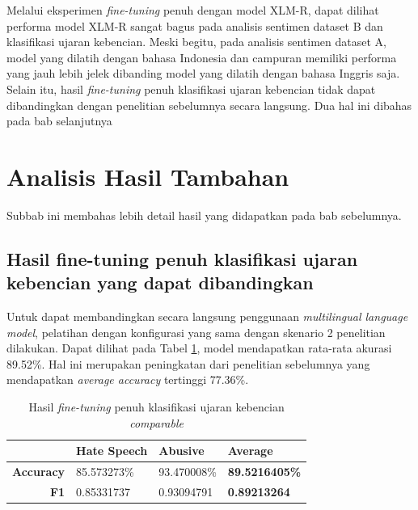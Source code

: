         Melalui eksperimen \textit{fine-tuning} penuh dengan model XLM-R, dapat dilihat performa model XLM-R sangat bagus pada analisis sentimen dataset B dan klasifikasi ujaran kebencian. Meski begitu, pada analisis sentimen dataset A, model yang dilatih dengan bahasa Indonesia dan campuran memiliki performa yang jauh lebih jelek dibanding model yang dilatih dengan bahasa Inggris saja. Selain itu, hasil \textit{fine-tuning} penuh klasifikasi ujaran kebencian tidak dapat dibandingkan dengan penelitian sebelumnya secara langsung. Dua hal ini dibahas pada bab selanjutnya

\section{Analisis Hasil Tambahan}
    Subbab ini membahas lebih detail hasil yang didapatkan pada bab sebelumnya.
    
    \subsection{Hasil fine-tuning penuh klasifikasi ujaran kebencian yang dapat dibandingkan}
        Untuk dapat membandingkan secara langsung penggunaan \textit{multilingual language model}, pelatihan dengan konfigurasi yang sama dengan skenario 2 penelitian \parencite{Ibrohim_Budi_2019} dilakukan. Dapat dilihat pada Tabel \ref{tab:toxic_xlm_r_comparable}, model mendapatkan rata-rata akurasi 89.52\%. Hal ini merupakan peningkatan dari penelitian sebelumnya yang mendapatkan \textit{average accuracy} tertinggi 77.36\%.

        \begin{table}[htb]
            \centering
            \caption{Hasil \textit{fine-tuning} penuh klasifikasi ujaran kebencian \textit{comparable}}
            \begin{tabular}{|r|l|l|l|}
            \hline
            \multicolumn{1}{|l|}{} & \textbf{Hate Speech} & \textbf{Abusive} & \textbf{Average}      \\ \hline
            \textbf{Accuracy}      & 85.573273\%          & 93.470008\%      & \textbf{89.5216405\%} \\ \hline
            \textbf{F1}            & 0.85331737           & 0.93094791       & \textbf{0.89213264}   \\ \hline
            \end{tabular}
            
            \label{tab:toxic_xlm_r_comparable}
        \end{table}

